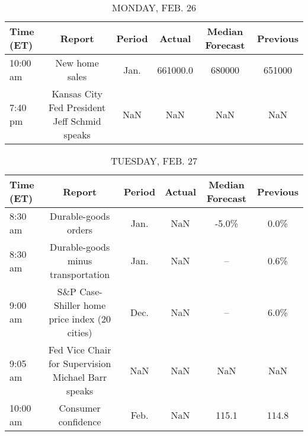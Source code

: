 \documentclass{article}%
\begin{document}
%
\normalsize%


\begin{table}[htbp]%
\caption{MONDAY, FEB. 26}%
\centering%
\begin{adjustbox}{width=1\textwidth}%
\begin{tabular}{lccccc}
\toprule
Time (ET) &                                       Report & Period &    Actual & Median Forecast & Previous \\
\midrule
 10:00 am &                               New home sales &   Jan. &  661000.0 &          680000 &   651000 \\
  7:40 pm & Kansas City Fed President Jeff Schmid speaks &    NaN &       NaN &             NaN &      NaN \\
\bottomrule
\end{tabular}
%
\end{adjustbox}%
\end{table}

%


\begin{table}[htbp]%
\caption{TUESDAY, FEB. 27}%
\centering%
\begin{adjustbox}{width=1\textwidth}%
\begin{tabular}{lccccc}
\toprule
Time (ET) &                                             Report & Period & Actual & Median Forecast & Previous \\
\midrule
  8:30 am &                               Durable-goods orders &   Jan. &    NaN &           -5.0\% &     0.0\% \\
  8:30 am &                 Durable-goods minus transportation &   Jan. &    NaN &              -- &     0.6\% \\
  9:00 am &      S\&P Case-Shiller home price index (20 cities) &   Dec. &    NaN &              -- &     6.0\% \\
  9:05 am & Fed Vice Chair for Supervision Michael Barr speaks &    NaN &    NaN &             NaN &      NaN \\
 10:00 am &                                Consumer confidence &   Feb. &    NaN &           115.1 &    114.8 \\
\bottomrule
\end{tabular}
%
\end{adjustbox}%
\end{table}

%
\end{document}

